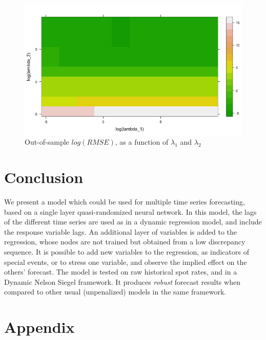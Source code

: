 \begin{figure}[!htb]
\centering
  \includegraphics[width=14cm]{gfx/chapter-rvfl-mts/log_rmse_convergence}
\caption{Out-of-sample $log(RMSE)$, as a function of $\lambda_1$ and $\lambda_2$}
\label{example3:3}       %
\end{figure}

\newpage

\section{Conclusion}

We present a model which could be used for multiple time series forecasting, based on a single layer quasi-randomized neural network. In this model, the lags of the different time series are used as in a dynamic regression model, and include the response variable lags. An additional layer of variables is added to the regression, whose nodes are not trained but obtained from a low discrepancy sequence. It is possible to add new variables to the regression, as indicators of special events, or to stress one variable, and observe the implied effect on the others' forecast. The model is tested on raw historical spot rates, and in a Dynamic Nelson Siegel framework. It produces \textit{robust} forecast results when compared to other usual (unpenalized) models in the same framework.

\newpage

\section{Appendix}


